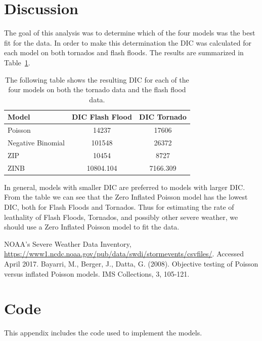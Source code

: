 \documentclass{article}\usepackage[]{graphicx}\usepackage[]{color}
\begin{document}
\section{Discussion}
\label{s:discussion}
The goal of this analysis was to determine which of the four models was the best fit for the data. In order to make this determination the DIC was calculated for each model on both tornados and flash floods. The results are summarized in Table~\ref{t:evalresults}.

\begin{table}
\centering
\caption{The following table shows the resulting DIC for each of the four models on both the tornado data and the flash flood data.}
\label{t:evalresults}
\begin{tabular}{lcc}
\toprule
Model & DIC Flash Flood & DIC Tornado\\
\midrule
Poisson & 14237 & 17606\\
Negative Binomial & 101548 & 26372\\
ZIP & 10454 & 8727 \\
ZINB & 10804.104&7166.309\\
\bottomrule
\end{tabular}
\end{table}

In general, models with smaller DIC are preferred to models with larger DIC. From the table we can see that the Zero Inflated Poisson model has the lowest DIC, both for Flash Floods and Tornados. Thus for estimating the rate of leathality of Flash Floods, Tornados, and possibly other severe weather, we should use a Zero Inflated Poisson model to fit the data. 

\clearpage
\begin{thebibliography}{2}
   NOAA's Severe Weather Data Inventory, 
    \url{https://www1.ncdc.noaa.gov/pub/data/swdi/stormevents/csvfiles/}. 
    Accessed April 2017.
   Bayarri, M., Berger, J., Datta, G. (2008). Objective testing of Poisson versus inflated Poisson models. IMS 	Collections, 3, 105-121. 
\end{thebibliography}

\appendix
\section{Code}
\label{a:code}
This appendix includes the code used to implement the models.
\end{document}
